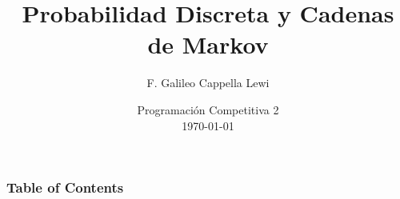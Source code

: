 \documentclass{beamer}
\title{Probabilidad Discreta y Cadenas de Markov}
\author{F. Galileo Cappella Lewi}
\date[PC2 2023]{Programación Competitiva 2\\\today}
\begin{document}
\frame{\titlepage}

\begin{frame}
  \frametitle{Table of Contents}
  \tableofcontents
\end{frame}






\end{document}
